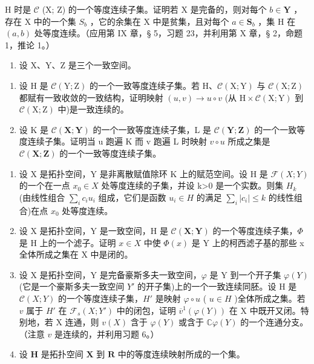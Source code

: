 H 时是 \(\mathcal{C}\) (X; Z) 的一个等度连续子集。证明若 X 是完备的，则对每个 \(b \in \mathbf{Y}\) ，存在 X 中的一个集 \(S_b\) ，它的余集在 X 中是贫集，且对每个 \(a \in \mathbf{S}_b\) ，集 H 在 \((a, b)\) 处等度连续。（应用第 IX 章，§ 5，习题 23，并利用第 X 章，§ 2，命题 1，推论 1。）

\begin{enumerate}
\def\labelenumi{\arabic{enumi})}
\setcounter{enumi}{3}
\tightlist
\item
  设 X、Y、Z 是三个一致空间。
\end{enumerate}

\begin{enumerate}
\def\labelenumi{\alph{enumi})}
\item
  设 H 是 \(\mathcal{C}(\mathrm{Y};\mathrm{Z})\) 的一个一致等度连续子集。若 H、\(\mathcal{C}(\mathrm{X};\mathrm{Y})\) 与 \(\mathcal{C}(\mathrm{X};\mathrm{Z})\) 都赋有一致收敛的一致结构，证明映射 \((u,v)\to u\circ v\) (从 \(\mathrm{H}\times \mathcal{C}(\mathrm{X};\mathrm{Y})\) 到 \(\mathcal{C}(\mathrm{X};\mathrm{Z})\) 中)是一致连续的。
\item
  设 K 是 \(\mathcal{C}(\mathbf{X};\mathbf{Y})\) 的一个一致等度连续子集，L 是 \(\mathcal{C}(\mathbf{Y};\mathbf{Z})\) 的一个一致等度连续子集。证明当 u 跑遍 K 而 v 跑遍 L 时映射 \(v \circ u\) 所成之集是 \(\mathcal{C}(\mathbf{X};\mathbf{Z})\) 的一个一致等度连续子集。
\end{enumerate}

\begin{enumerate}
\def\labelenumi{\arabic{enumi})}
\setcounter{enumi}{4}
\item
  设 X 是拓扑空间，Y 是非离散赋值除环 K 上的赋范空间。设 H 是 \(\mathcal{F}(X;Y)\) 的一个在一点 \(x_{0}\in X\) 处等度连续的子集，并设 k\textgreater0 是一个实数。则集 \(H_{k}\) (由线性组合 \(\sum_{i}c_{i}u_{i}\) 组成，它们是函数 \(u_{i}\in H\) 的满足 \(\sum_{i}|c_{i}|\leqslant k\) 的线性组合)在点 \(x_{0}\) 处等度连续。
\item
  设 X 是拓扑空间，Y 是一致空间，H 是 \(\mathcal{C}(\mathbf{X};\mathbf{Y})\) 的一个等度连续子集，\(\Phi\) 是 H 上的一个滤子。证明 \(x\in X\) 中使 \(\Phi(x)\) 是 Y 上的柯西滤子基的那些 x 全体所成之集在 X 中是闭的。
\item
  设 X 是拓扑空间，Y 是完备豪斯多夫一致空间，\(\varphi\) 是 Y 到一个开子集 \(\varphi(Y)\) (它是一个豪斯多夫一致空间 \(Y'\) 的开子集)上的一个一致连续同胚。设 H 是 \(\mathcal{C}(X; Y)\) 的一个等度连续子集，\(H'\) 是映射 \(\varphi \circ u\) ( \(u \in H\) )全体所成之集。若 \(v\) 属于 \(H'\) 在 \(\mathcal{F}_s(X; Y')\) 中的闭包，证明 \(\overline{v}^{1}(\varphi(Y))\) 在 X 中既开又闭。特别地，若 X 连通，则 \(v(X)\) 含于 \(\varphi(Y)\) 或含于 \(\mathbb{C}\varphi(Y)\) 的一个连通分支。（注意 \(v\) 是连续的，并利用习题 6。）
\item
  设 \(\mathbf{H}\) 是拓扑空间 \(\mathbf{X}\) 到 \(\mathbf{R}\) 中的等度连续映射所成的一个集。
\end{enumerate}

